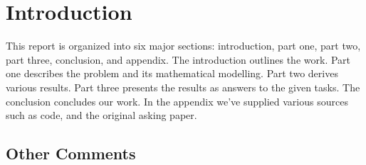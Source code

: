 \section{Introduction}\label{sec:intro}
This report is organized into six major sections: introduction, part one, part two, part three, conclusion, and appendix. The introduction outlines the work. Part one describes the problem and its mathematical modelling. Part two derives various results. Part three presents the results as answers to the given tasks. The conclusion concludes our work. In the appendix we've supplied various sources such as code, and the original asking paper.



\subsection{Other Comments}
